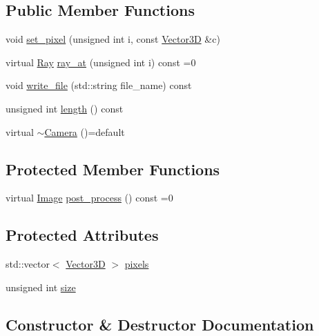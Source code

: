 \subsection*{Public Member Functions}
\begin{DoxyCompactItemize}
\item 
void \hyperlink{classcamera_1_1Camera_aa6152a7c756850336a977d21a4462c6f}{set\+\_\+pixel} (unsigned int i, const \hyperlink{classVector3D}{Vector3D} \&c)
\item 
virtual \hyperlink{classRay}{Ray} \hyperlink{classcamera_1_1Camera_adf751a32f3b3b9ea5df48affafc39732}{ray\+\_\+at} (unsigned int i) const =0
\item 
void \hyperlink{classcamera_1_1Camera_a7ea257efc92d5f1d9d560ec11045e583}{write\+\_\+file} (std\+::string file\+\_\+name) const 
\item 
unsigned int \hyperlink{classcamera_1_1Camera_a423a89150b51003b1b0c75066165a980}{length} () const 
\item 
virtual \hyperlink{classcamera_1_1Camera_ae53a2162b5909211552ec49de1f5a746}{$\sim$\+Camera} ()=default
\end{DoxyCompactItemize}
\subsection*{Protected Member Functions}
\begin{DoxyCompactItemize}
\item 
virtual \hyperlink{namespacecamera_a67b7fb3d5582463a057ed122bf739b7d}{Image} \hyperlink{classcamera_1_1Camera_a56d942e3c4b51263bd7af3351da15d9f}{post\+\_\+process} () const =0
\end{DoxyCompactItemize}
\subsection*{Protected Attributes}
\begin{DoxyCompactItemize}
\item 
std\+::vector$<$ \hyperlink{classVector3D}{Vector3D} $>$ \hyperlink{classcamera_1_1Camera_a53f3fe9b838bc48e9ec21973dc8b516c}{pixels}
\item 
unsigned int \hyperlink{classcamera_1_1Camera_ac05b929c8b4f40d74ee682c4aad4c53d}{size}
\end{DoxyCompactItemize}


\subsection{Constructor \& Destructor Documentation}
